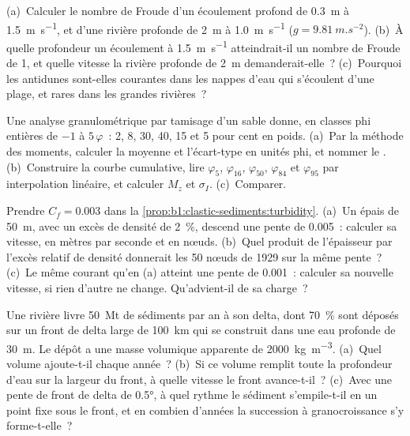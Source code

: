 \begin{exercise}[$\star\star$]\label{exo:b1:clastic-sediments:9}
(a)~Calculer le nombre de Froude d'un écoulement profond de \qty{0.3}{m} à
\qty{1.5}{m.s^{-1}}, et d'une rivière profonde de \qty{2}{m} à \qty{1.0}{m.s^{-1}} ($g
= \qty{9.81}{m.s^{-2}}$). (b)~À quelle profondeur un écoulement à
\qty{1.5}{m.s^{-1}} atteindrait-il un nombre de Froude de 1, et quelle vitesse la rivière
profonde de \qty{2}{m} demanderait-elle~? (c)~Pourquoi les antidunes sont-elles courantes dans les nappes d'eau qui
s'écoulent d'une plage, et rares dans les grandes rivières~?
\end{exercise}

\begin{exercise}[$\star\star\star$]\label{exo:b1:clastic-sediments:10}
Une analyse granulométrique par tamisage d'un sable donne, en classes phi entières de $-1$ à
$5\,\varphi$~: 2, 8, 30, 40, 15 et 5 pour cent en poids. (a)~Par la méthode des
moments, calculer la moyenne et l'écart-type en unités phi, et nommer le
. (b)~Construire la courbe cumulative, lire $\varphi_5$, $\varphi_{16}$,
$\varphi_{50}$, $\varphi_{84}$ et $\varphi_{95}$ par interpolation linéaire, et
calculer $M_z$ et $\sigma_I$. (c)~Comparer.
\end{exercise}

\begin{exercise}[$\star\star\star$]\label{exo:b1:clastic-sediments:11}
Prendre $C_f = 0.003$ dans la \cref{prop:b1:clastic-sediments:turbidity}. (a)~Un
 épais de \qty{50}{m}, avec un excès de densité de
\qty{2}{\percent}, descend une pente de \num{0.005}~: calculer sa vitesse, en mètres
par seconde et en nœuds. (b)~Quel produit de l'épaisseur par l'excès relatif de densité
donnerait les 50 nœuds de 1929 sur la même pente~? (c)~Le même courant
qu'en (a) atteint une pente de \num{0.001}~: calculer sa nouvelle vitesse, si rien
d'autre ne change. Qu'advient-il de sa charge~?
\end{exercise}

\begin{exercise}[$\star\star\star$]\label{exo:b1:clastic-sediments:12}
Une rivière livre \qty{50}{Mt} de sédiments par an à son delta, dont
\qty{70}{\percent} sont déposés sur un front de delta large de \qty{100}{km} qui se construit
dans une eau profonde de \qty{30}{m}. Le dépôt a une masse volumique apparente de
\qty{2000}{kg.m^{-3}}. (a)~Quel volume ajoute-t-il chaque année~? (b)~Si ce volume
remplit toute la profondeur d'eau sur la largeur du front, à quelle vitesse le
front avance-t-il~? (c)~Avec une pente de front de delta de \ang{0.5}, à quel rythme
le sédiment s'empile-t-il en un point fixe sous le front, et en combien d'années
la succession à granocroissance s'y forme-t-elle~?
\end{exercise}

